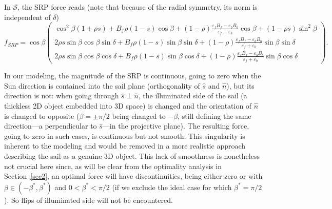 \documentclass[AMA,STIX1COL]{WileyNJD-v2}
\newcommand{\uvect}[1]{\hat{#1}}
\newcommand{\vect}[1]{#1}
\renewcommand{\epsilon}{\varepsilon}
\begin{document}
In $\mathcal{S}$, the \ac{SRP} force reads (note that because of the radial
symmetry, its norm is independent of $\delta$)
\begin{equation}
	\vect{f}_{SRP} = \cos\beta
	\begin{pmatrix}
		\cos^2 \beta (1 + \rho s) + B_f \rho (1-s) \cos \beta + (1-\rho) \frac{\epsilon_f B_f - \epsilon_b B_b}{\epsilon_f + \epsilon_b} \cos \beta + (1-\rho s)  \sin^2 \beta\\
		2 \rho s \sin \beta \cos \beta \sin \delta + B_f \rho (1-s) \sin \beta \sin \delta + (1 - \rho) \frac{\epsilon_f B_f - \epsilon_b B_b}{\epsilon_f + \epsilon_b} \sin \beta \sin \delta \\
		2 \rho s \sin \beta \cos \beta \cos \delta + B_f \rho (1-s) \sin \beta \cos \delta + (1 - \rho) \frac{\epsilon_f B_f - \epsilon_b B_b}{\epsilon_f + \epsilon_b} \sin \beta \cos \delta
			\end{pmatrix}.
\end{equation}

\begin{remark} \label{rem110}
In our modeling, the magnitude of the SRP is continuous, going to zero when the Sun direction
is contained into the sail plane (orthogonality of $\uvect{s}$ and $\uvect{n}$),
but its direction is not: when going through $\uvect{s} \perp \uvect{n}$, the illuminated side of the sail
(a thickless 2D object embedded into 3D space) is changed and the orientation of $\uvect{n}$
is changed to opposite ($\beta=\pm\pi/2$ being changed to $-\beta$, still defining the same
direction---a perpendicular to $\uvect{s}$---in the projective plane).
The resulting force, going to zero in such cases,
is continuous but not smooth. This singularity is inherent to the modeling and would be removed in a more 
realistic approach describing the sail as a genuine 3D object. This lack of smoothness
is nonetheless not crucial here since,
as will be clear from the optimality analysis in Section~\ref{sec2}, an optimal force will have
discontinuities, being either zero or with $\beta \in (-\beta^*,\beta^*)$ and $0 < \beta^* < \pi/2$ (if
we exclude the ideal case for which $\beta^*=\pi/2$).
So flips of illuminated side will not be encountered.
\end{remark}
\end{document}
